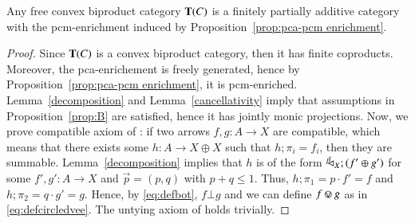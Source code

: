 \begin{proposition}\label{prop:T(C) is a FinPAc}
    Any free convex biproduct category $\mathbf{T}(C)$ is a finitely partially additive category with the pcm-enrichment induced by Proposition~\ref{prop:pca-pcm enrichment}.
\end{proposition}
\begin{proof}
Since $\mathbf{T}(C)$ is a convex biproduct category, then it has finite coproducts. Moreover, the pca-enrichement is freely generated, hence by Proposition~\ref{prop:pca-pcm enrichment}, it is pcm-enriched. Lemma~\ref{decomposition} and Lemma~\ref{cancellativity} imply that assumptions in Proposition~\ref{prop:B} are satisfied, hence it has jointly monic projections. Now, we prove compatible axiom of \cite[Definition 3.1.2]{chophd}: if two arrows $f,g\colon A \to X$
are compatible, which means that there exists some $h\colon A\to X \oplus X$ such that $h;\pi_i=f_i$, then they are summable. Lemma~\ref{decomposition} implies that $h$ is of the form $^{\vec{p}}\!\! \lhd_{X};(f'\oplus  g')$ for some $f',g'\colon A \to X$ and $\vec{p}=(p,q)$ with $p+q\leq 1$. Thus, $h;\pi_1 = p\cdot f'=f$ and $h;\pi_2 = q\cdot g' = g$. Hence, by \eqref{eq:defbot}, $f\bot g$ and we can define $f\circledvee g$ as in \eqref{eq:defcircledvee}. The untying axiom of \cite[Definition 3.1.2]{chophd} holds trivially.
\end{proof}
\fi


